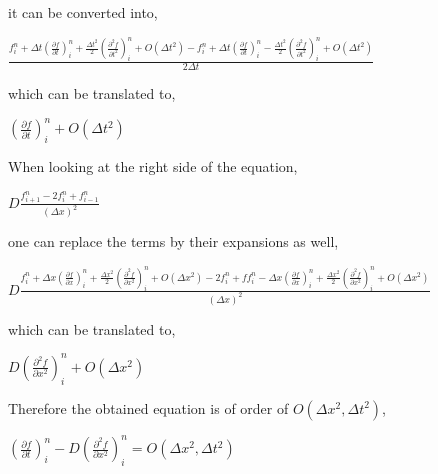 \documentclass[12pt]{report}
\begin{document}
\par it can be converted into,

\begin{center}
\Large
$
\frac{f_i^{n} + \Delta t \left( \frac{\partial f}{\partial t} \right)_i^n + \frac{\Delta t ^2}{2} \left( \frac{\partial ^2 f}{\partial t ^2} \right)_i^n + O(\Delta t ^2) - f_i^{n} + \Delta t \left( \frac{\partial f}{\partial t} \right)_i^n - \frac{\Delta t ^2}{2} \left( \frac{\partial ^2 f}{\partial t ^2} \right)_i^n + O(\Delta t ^2)}{2 \Delta t}
$
\end{center}

\par which can be translated to,

\begin{center}
\Large
$
\left( \frac{\partial f}{\partial t} \right)_i^n + O(\Delta t ^2)
$
\end{center}

\par When looking at the right side of the equation,

\begin{center}
\Large
$
D \frac{f_{i + 1}^{n} - 2f_{i}^{n} + f_{i - 1}^{n}}{(\Delta x)^2}
$
\end{center}

\par one can replace the terms by their expansions as well,

\begin{center}
\Large
$
D \frac{f_i^{n} + \Delta x \left( \frac{\partial f}{\partial x} \right)_i^n + \frac{\Delta x ^2}{2} \left( \frac{\partial ^2 f}{\partial x ^2} \right)_i^n + O(\Delta x ^2) - 2f_{i}^{n} + ff_i^{n} - \Delta x \left( \frac{\partial f}{\partial x} \right)_i^n + \frac{\Delta x ^2}{2} \left( \frac{\partial ^2 f}{\partial x ^2} \right)_i^n + O(\Delta x ^2)}{(\Delta x)^2}
$
\end{center}

\par which can be translated to,

\begin{center}
\Large
$
D \left( \frac{\partial ^2 f}{\partial x ^2} \right)_i^n + O(\Delta x ^2)
$
\end{center}

\par Therefore the obtained equation is of order of $O(\Delta x ^2, \Delta t ^2)$,

\begin{center}
\Large
$
\left( \frac{\partial f}{\partial t} \right)_i^n - D \left( \frac{\partial ^2 f}{\partial x ^2} \right)_i^n = O(\Delta x ^2, \Delta t ^2)
$
\end{center}
\end{document}
